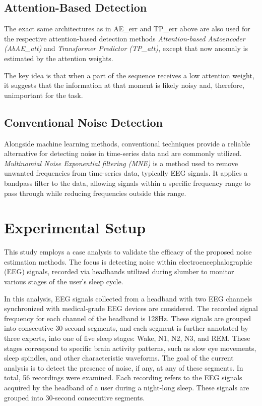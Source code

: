 \documentclass[runningheads]{llncs}
\begin{document}
\subsection{Attention-Based Detection}

The exact same architectures as in AE\_err and TP\_err above are also used
for the respective attention-based detection methods
\emph{Attention-based Autoencoder (AbAE\_att)} and \emph{Transformer
Predictor (TP\_att)}, except that now anomaly is estimated by the
attention weights.

The key idea is that when a part of the sequence receives a low
attention weight, it suggests that the information at that moment is
likely noisy and, therefore, unimportant for the task.


\subsection{Conventional Noise Detection}

Alongside machine learning methods, conventional techniques provide a
reliable alternative for detecting noise in time-series data and are
commonly utilized.
%
\emph{Multinomial Noise Exponential filtering (MNE)} is a method used
to remove unwanted frequencies from time-series data, typically EEG
signals. It applies a bandpass filter to the data, allowing signals
within a specific frequency range to pass through while reducing
frequencies outside this range.



\section{Experimental Setup}
\label{sec:exp}

This study employs a case analysis to validate the efficacy of the
proposed noise estimation methods. The focus is detecting noise within
electroencephalographic (EEG) signals, recorded via headbands utilized
during slumber to monitor various stages of the user's sleep cycle.

In this analysis, EEG signals collected from a headband with two EEG
channels synchronized with medical-grade EEG devices are
considered. The recorded signal frequency for each channel of the
headband is 128Hz. These signals are grouped into consecutive
30-second segments, and each segment is further annotated by three
experts, into one of five sleep stages: Wake, N1, N2, N3, and
REM. These stages correspond to specific brain activity patterns, such
as slow eye movements, sleep spindles, and other characteristic
waveforms. The goal of the current analysis is to detect the presence
of noise, if any, at any of these segments. In total, 56 recordings
were examined. Each recording refers to the EEG signals acquired by
the headband of a user during a night-long sleep. These signals are
grouped into 30-second consecutive segments.
\end{document}

